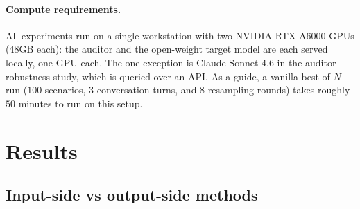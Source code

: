 \documentclass{article}
\begin{document}
\paragraph{Compute requirements.} All experiments run on a single workstation with two NVIDIA RTX A6000 GPUs (48GB each): the auditor and the open-weight target model are each served locally, one GPU each. The one exception is Claude-Sonnet-4.6 in the auditor-robustness study, which is queried over an API.
As a guide, a vanilla best-of-$N$ run ($100$ scenarios, $3$ conversation turns, and $8$ resampling rounds) takes roughly $50$ minutes to run on this setup.







\section{Results}

\subsection{Input-side vs output-side methods}
\end{document}

